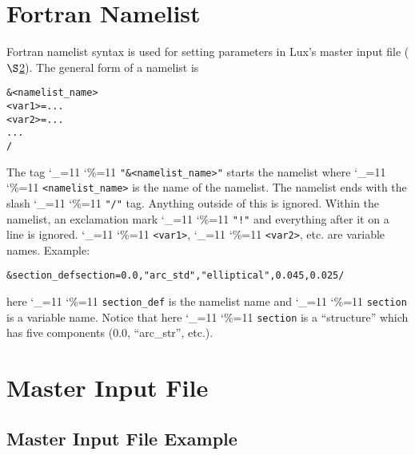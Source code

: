 \documentclass[11pt]{article}
\newcommand{\lux}{Lux\xspace}
\newcommand\ttcmd{\begingroup\catcode`\_=11 \catcode`\%=11 \dottcmd}
\newcommand\dottcmd[1]{\texttt{#1}\endgroup}
\newcommand{\vn}{\ttcmd}
\newcommand{\sref}[1]{$\S$\ref{#1}}
\newenvironment{example}
  {\vspace{\ExBeg} \begin{alltt}}
  {\end{alltt} \vspace{\ExEnd}}
\newlength{\ExBeg}
\newlength{\ExEnd}
\begin{document}
\section{Fortran Namelist}
\label{s:namelist}

Fortran namelist syntax is used for setting parameters in \lux's
master input file (\sref{s:master.file}). The general form of a
namelist is
\begin{example}
  &<namelist_name>
    <var1> = ...
    <var2> = ...
    ...
  /
\end{example}
The tag \vn{"\&<namelist_name>"} starts the namelist where
\vn{<namelist_name>} is the name of the namelist. The namelist ends
with the slash \vn{"/"} tag. Anything outside of this is
ignored. Within the namelist, an exclamation mark \vn{"!"} and
everything after it on a line is ignored. \vn{<var1>}, \vn{<var2>},
etc. are variable names. Example:
\begin{example}
  &section_def section =   0.0, "arc_std", "elliptical", 0.045, 0.025 /
\end{example}
here \vn{section_def} is the namelist name and \vn{section} is a variable
name.  Notice that here \vn{section} is a ``structure'' which has five
components (0.0, ``arc_str'', etc.).

\section{Master Input File} 
\label{s:master.file}

\subsection{Master Input File Example}
\label{ss:master.example}
\end{document}

